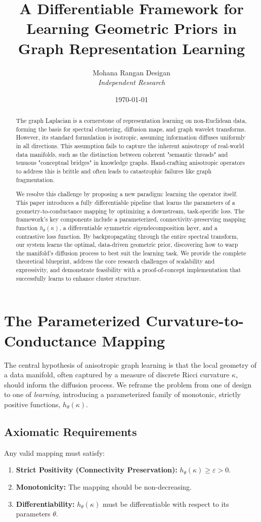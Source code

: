 \documentclass[11pt, letterpaper]{article}
\title{\textbf{A Differentiable Framework for Learning Geometric Priors in Graph Representation Learning}}
\author{Mohana Rangan Desigan \\ \textit{Independent Research}}
\date{\today}
\begin{document}
\maketitle

\begin{abstract}
The graph Laplacian is a cornerstone of representation learning on non-Euclidean data, forming the basis for spectral clustering, diffusion maps, and graph wavelet transforms. However, its standard formulation is isotropic, assuming information diffuses uniformly in all directions. This assumption fails to capture the inherent anisotropy of real-world data manifolds, such as the distinction between coherent "semantic threads" and tenuous "conceptual bridges" in knowledge graphs. Hand-crafting anisotropic operators to address this is brittle and often leads to catastrophic failures like graph fragmentation.

We resolve this challenge by proposing a new paradigm: learning the operator itself. This paper introduces a fully differentiable pipeline that learns the parameters of a geometry-to-conductance mapping by optimizing a downstream, task-specific loss. The framework's key components include a parameterized, connectivity-preserving mapping function $h_\theta(\kappa)$, a differentiable symmetric eigendecomposition layer, and a contrastive loss function. By backpropagating through the entire spectral transform, our system learns the optimal, data-driven geometric prior, discovering how to warp the manifold's diffusion process to best suit the learning task. We provide the complete theoretical blueprint, address the core research challenges of scalability and expressivity, and demonstrate feasibility with a proof-of-concept implementation that successfully learns to enhance cluster structure.
\end{abstract}

\section{The Parameterized Curvature-to-Conductance Mapping}

The central hypothesis of anisotropic graph learning is that the local geometry of a data manifold, often captured by a measure of discrete Ricci curvature $\kappa$, should inform the diffusion process. We reframe the problem from one of design to one of \textit{learning}, introducing a parameterized family of monotonic, strictly positive functions, $h_\theta(\kappa)$.

\subsection{Axiomatic Requirements}
Any valid mapping must satisfy:
\begin{enumerate}
    \item \textbf{Strict Positivity (Connectivity Preservation):} $h_\theta(\kappa) \ge \varepsilon > 0$.
    \item \textbf{Monotonicity:} The mapping should be non-decreasing.
    \item \textbf{Differentiability:} $h_\theta(\kappa)$ must be differentiable with respect to its parameters $\theta$.
\end{enumerate}
\end{document}
